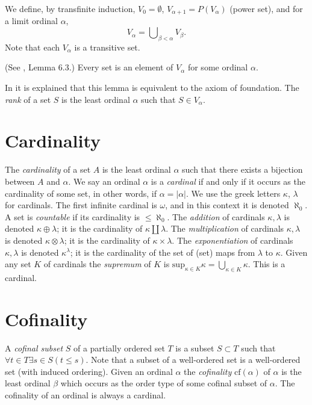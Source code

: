 \medskip\noindent
We define, by transfinite induction, $V_0 = \emptyset$,
$V_{\alpha + 1} = P(V_\alpha)$ (power set),
and for a limit ordinal $\alpha$,
$$
V_\alpha = \bigcup\nolimits_{\beta < \alpha} V_\beta.
$$
Note that each $V_\alpha$ is a transitive set.

\begin{lemma}
\label{axiom-regularity}
(See \cite{Jech}, Lemma 6.3.)
Every set is an element of $V_\alpha$ for some ordinal $\alpha$.
\end{lemma}

\noindent
In \cite[Chapter III]{Kunen} it is explained that this lemma is
equivalent to the axiom of foundation. The {\it rank} of
a set $S$ is the least ordinal $\alpha$ such that $S \in V_\alpha$.

\section{Cardinality}
\label{section-cardinals}

\noindent
The {\it cardinality} of a set $A$ is the least ordinal $\alpha$
such that there exists a bijection between $A$ and $\alpha$.
We say an ordinal $\alpha$ is a {\it cardinal} if and only
if it occurs as the cardinality of some set, in other words, if
$\alpha = |\alpha|$. We use the greek letters $\kappa$, $\lambda$
for cardinals. The first infinite cardinal is $\omega$, and in this
context it is denoted $\aleph_0$. A set is {\it countable} if its cardinality
is $\leq \aleph_0$. The {\it addition} of cardinals $\kappa, \lambda$
is denoted $\kappa \oplus \lambda$; it is the cardinality of
$\kappa \amalg \lambda$. The {\it multiplication} of cardinals
$\kappa, \lambda$ is denoted $\kappa \otimes \lambda$; it is the
cardinality of $\kappa \times \lambda$. The {\it exponentiation}
of cardinals $\kappa, \lambda$ is denoted $\kappa^\lambda$; it is
the cardinality of the set of (set) maps from $\lambda$ to $\kappa$.
Given any set $K$ of cardinals the {\it supremum} of $K$
is $\text{sup}_{\kappa \in K} \kappa = \bigcup_{\kappa \in K} \kappa$.
This is a cardinal.

\section{Cofinality}
\label{section-cofinality}

\noindent
A {\it cofinal subset} $S$ of a partially ordered set $T$ is a subset
$S \subset T$ such that $\forall t \in T \exists s\in S (t \leq s)$.
Note that a subset of a well-ordered set is a well-ordered set
(with induced ordering). Given an ordinal $\alpha$ the {\it cofinality}
$\text{cf}(\alpha)$ of $\alpha$ is the least ordinal $\beta$
which occurs as the order type of some cofinal subset of $\alpha$.
The cofinality of an ordinal is always a cardinal.

